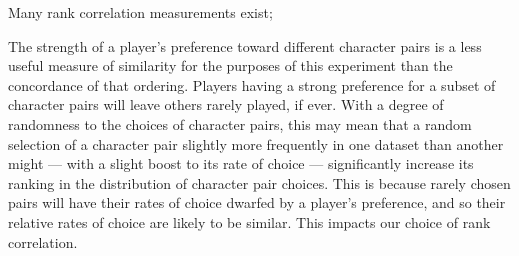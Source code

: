 Many rank correlation measurements exist; 


The strength of a player's preference toward different character pairs is a less useful measure of
similarity for the purposes of this experiment than the concordance of that ordering. Players having
a strong preference for a subset of character pairs will leave others rarely played, if ever.
With a degree of randomness to the choices of character pairs, this may mean that a random selection of
a character pair slightly more frequently in one dataset than another might --- with a slight boost to its
rate of choice --- significantly increase its ranking in the distribution of character pair choices.
This is because rarely chosen pairs will have their rates of choice dwarfed by a player's preference, and
so their relative rates of choice are likely to be similar. This impacts our choice of rank correlation.





